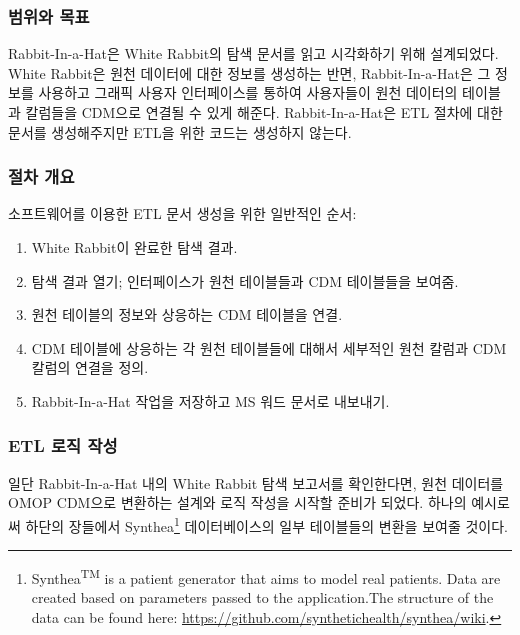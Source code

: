 \documentclass[11pt]{book}
\providecommand{\tightlist}{%
  \setlength{\itemsep}{0pt}\setlength{\parskip}{0pt}}
\let\rmarkdownfootnote\footnote%
\def\footnote{\protect\rmarkdownfootnote}
\theoremstyle{definition}
\theoremstyle{definition}
\theoremstyle{definition}
\theoremstyle{remark}
\begin{document}
\subsubsection*{범위와 목표}\label{--1}

Rabbit-In-a-Hat은 White Rabbit의 탐색 문서를 읽고 시각화하기 위해
설계되었다. White Rabbit은 원천 데이터에 대한 정보를 생성하는 반면,
Rabbit-In-a-Hat은 그 정보를 사용하고 그래픽 사용자 인터페이스를 통하여
사용자들이 원천 데이터의 테이블과 칼럼들을 CDM으로 연결될 수 있게
해준다. Rabbit-In-a-Hat은 ETL 절차에 대한 문서를 생성해주지만 ETL을 위한
코드는 생성하지 않는다.

\subsubsection*{절차 개요}\label{--1}

소프트웨어를 이용한 ETL 문서 생성을 위한 일반적인 순서:

\begin{enumerate}
\def\labelenumi{\arabic{enumi}.}
\tightlist
\item
  White Rabbit이 완료한 탐색 결과.
\item
  탐색 결과 열기; 인터페이스가 원천 테이블들과 CDM 테이블들을 보여줌.
\item
  원천 테이블의 정보와 상응하는 CDM 테이블을 연결.
\item
  CDM 테이블에 상응하는 각 원천 테이블들에 대해서 세부적인 원천 칼럼과
  CDM 칼럼의 연결을 정의.
\item
  Rabbit-In-a-Hat 작업을 저장하고 MS 워드 문서로 내보내기.
\end{enumerate}

\subsubsection*{ETL 로직 작성}\label{etl--}

일단 Rabbit-In-a-Hat 내의 White Rabbit 탐색 보고서를 확인한다면, 원천
데이터를 OMOP CDM으로 변환하는 설계와 로직 작성을 시작할 준비가 되었다.
하나의 예시로써 하단의 장들에서 Synthea\footnote{Synthea\textsuperscript{TM}
  is a patient generator that aims to model real patients. Data are
  created based on parameters passed to the application.The structure of
  the data can be found here:
  \url{https://github.com/synthetichealth/synthea/wiki}.} 데이터베이스의
일부 테이블들의 변환을 보여줄 것이다.
\end{document}
